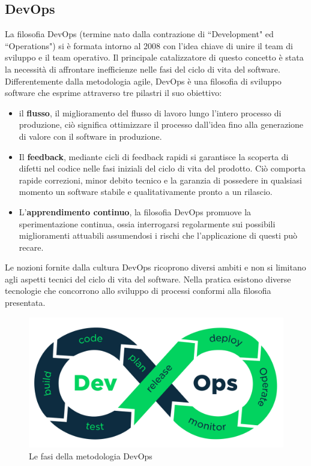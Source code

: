 \subsection{DevOps}
La filosofia DevOps (termine nato dalla contrazione di ``Development" ed ``Operations") si è formata intorno al 2008 con l'idea chiave di unire il team di sviluppo e il team operativo. Il principale catalizzatore di questo concetto è stata la necessità di affrontare inefficienze nelle fasi del ciclo di vita del software. Differentemente dalla metodologia agile, DevOps è una filosofia di sviluppo software che esprime attraverso tre pilastri il suo obiettivo:

\begin{itemize}
	\item il \textbf{flusso}, il miglioramento del flusso di lavoro lungo l'intero processo di produzione, ciò significa ottimizzare il processo dall'idea fino alla generazione di valore con il software in produzione.
	\item Il \textbf{feedback}, mediante cicli di feedback rapidi si garantisce la scoperta di difetti nel codice nelle fasi iniziali del ciclo di vita del prodotto. Ciò comporta rapide correzioni, minor debito tecnico e la garanzia di possedere in qualsiasi momento un software stabile e qualitativamente pronto a un rilascio.
	\item L'\textbf{apprendimento continuo}, la filosofia DevOps promuove la sperimentazione continua, ossia interrogarsi regolarmente sui possibili miglioramenti attuabili assumendosi i rischi che l'applicazione di questi può recare.
\end{itemize}

Le nozioni fornite dalla cultura DevOps ricoprono diversi ambiti e non si limitano agli aspetti tecnici del ciclo di vita del software. Nella pratica esistono diverse tecnologie che concorrono allo sviluppo di processi conformi alla filosofia presentata.

\begin{figure}[htb]
	\centering
	\includegraphics[width=.8\linewidth]{figures/devops-process.png}
	\caption{Le fasi della metodologia DevOps}
	\label{fig:devops-process}
\end{figure}


